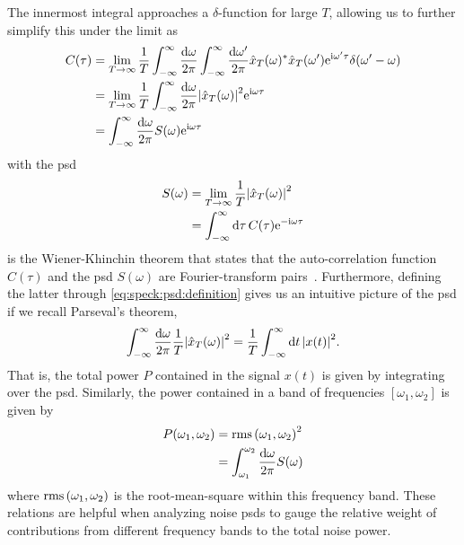 The innermost integral approaches a $\delta$-function for large $T$,
allowing us to further simplify this under the limit as
\begin{align}
    C(\tau) &= \lim_{T\to\infty} \frac{1}{T}\int_{-\infty}^{\infty}\frac{\dd{\omega}}{2\pi}\int_{-\infty}^{\infty}\frac{\dd{\omega^\prime}}{2\pi}
                \hat{x}_T(\omega)^{\ast}\hat{x}_T(\omega^\prime)
                \mathrm{e}^{\mathrm{i}\omega^\prime\tau}\delta(\omega^\prime - \omega)\\
            &= \lim_{T\to\infty}\frac{1}{T}
                \int_{-\infty}^{\infty}\frac{\dd{\omega}}{2\pi}\abs{\hat{x}_T(\omega)}^2 \mathrm{e}^{\mathrm{i}\omega\tau} \\
            &= \int_{-\infty}^{\infty}\frac{\dd{\omega}}{2\pi} S(\omega) \mathrm{e}^{\mathrm{i}\omega\tau} \label{eq:speck:wiener_khinchin}
\end{align}
with the \gls{psd}
\begin{align}
    S(\omega) &= \lim_{T\to\infty}\frac{1}{T}\abs{\hat{x}_T(\omega)}^2 \label{eq:speck:psd:definition}\\
              &= \int_{-\infty}^{\infty}\dd{\tau} C(\tau)\mathrm{e}^{-\mathrm{i}\omega\tau}
\end{align}
 is the Wiener-Khinchin theorem that states that the auto-correlation function $C(\tau)$ and the \gls{psd} $S(\omega)$ are Fourier-transform pairs~\cite{Koopmans1995}.
Furthermore, defining the latter through \cref{eq:speck:psd:definition} gives us an intuitive picture of the \gls{psd} if we recall Parseval's theorem,
\begin{align}\label{eq:speck:parseval}
    \int_{-\infty}^{\infty}\frac{\dd{\omega}}{2\pi}\frac{1}{T}\abs{\hat{x}_T(\omega)}^2 = \frac{1}{T}\int_{-\infty}^{\infty}\dd{t}\abs{x(t)}^2.
\end{align}
That is, the total power $P$ contained in the signal $x(t)$ is given by integrating over the \gls{psd}.
Similarly, the power contained in a band of frequencies $[\omega_1, \omega_2]$ is given by
\begin{align}
    P(\omega_1, \omega_2) &= \operatorname{rms}\left(\omega_1, \omega_2\right)^2 \\
                          &= \int_{\omega_1}^{\omega_2}\frac{\dd{\omega}}{2\pi} S(\omega) \label{eq:speck:psd:bandpower}
\end{align}
where $\operatorname{rms}\left(\omega_1, \omega_2\right)$ is the root-mean-square within this frequency band.
These relations are helpful when analyzing noise \glspl{psd} to gauge the relative weight of contributions from different frequency bands to the total noise power.

